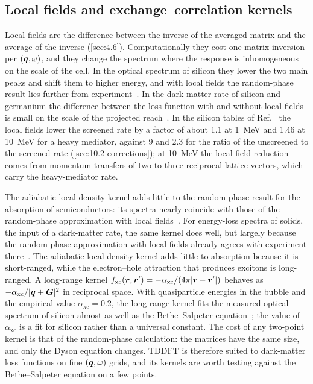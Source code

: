 \subsection{Local fields and exchange--correlation kernels}

Local fields are the difference between the inverse of the averaged matrix and the average of the inverse (\cref{sec:4.6}). Computationally they cost one matrix inversion per $(\bm{q},\omega)$, and they change the spectrum where the response is inhomogeneous on the scale of the cell. In the optical spectrum of silicon they lower the two main peaks and shift them to higher energy, and with local fields the random-phase result lies further from experiment~\cite{albrecht1998ab}. In the dark-matter rate of silicon and germanium the difference between the loss function with and without local fields is small on the scale of the projected reach~\cite{knapen2021dark}. In the silicon tables of Ref.~\cite{knapen2021dark} the local fields lower the screened rate by a factor of about 1.1 at \SI{1}{MeV} and 1.46 at \SI{10}{MeV} for a heavy mediator, against 9 and 2.3 for the ratio of the unscreened to the screened rate (\cref{sec:10.2-corrections}); at \SI{10}{MeV} the local-field reduction comes from momentum transfers of two to three reciprocal-lattice vectors, which carry the heavy-mediator rate.

The adiabatic local-density kernel adds little to the random-phase result for the absorption of semiconductors: its spectra nearly coincide with those of the random-phase approximation with local fields~\cite{reining2002excitonic}. For energy-loss spectra of solids, the input of a dark-matter rate, the same kernel does well, but largely because the random-phase approximation with local fields already agrees with experiment there~\cite{reining2002excitonic}. The adiabatic local-density kernel adds little to absorption because it is short-ranged, while the electron--hole attraction that produces excitons is long-ranged. A long-range kernel $f_{\mathrm{xc}}(\bm{r},\bm{r}') = -\alpha_{\mathrm{xc}}/(4\pi|\bm{r} - \bm{r}'|)$ behaves as $-\alpha_{\mathrm{xc}}/|\bm{q}+\bm{G}|^2$ in reciprocal space. With quasiparticle energies in the bubble and the empirical value $\alpha_{\mathrm{xc}} = 0.2$, the long-range kernel fits the measured optical spectrum of silicon almost as well as the Bethe--Salpeter equation~\cite{reining2002excitonic}; the value of $\alpha_{\mathrm{xc}}$ is a fit for silicon rather than a universal constant. The cost of any two-point kernel is that of the random-phase calculation: the matrices have the same size, and only the Dyson equation changes. TDDFT is therefore suited to dark-matter loss functions on fine $(\bm{q},\omega)$ grids, and its kernels are worth testing against the Bethe--Salpeter equation on a few points.

